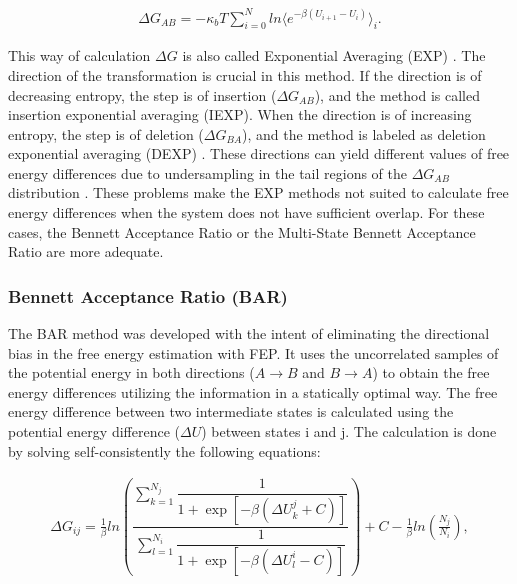 \documentclass[
	12pt,				%
	openany,			%
	oneside,			%
	a4paper,			%
	english,			%
	brazil				%
	]{abntex2}
\begin{document}
\begin{equation}
\label{eq:fepint}
\begin{aligned}
\Delta G_{AB} = -\kappa_{b}T  \sum_{i=0}^{N}
ln \langle {e^{-\beta (U_{i+1}-U_{i})}} \rangle_{i} .
\end{aligned}
\end{equation}

This way of calculation $\Delta G$ is also called Exponential Averaging (EXP) \cite{zwanzig1955,bareva}. The direction of the transformation is crucial in this method. If the direction is of decreasing entropy, the step is of insertion ($\Delta G_{AB}$), and the method is called insertion exponential averaging (IEXP). When the direction is of increasing entropy, the step is of deletion ($\Delta G_{BA}$), and the method is labeled as deletion exponential averaging (DEXP) \cite{bareva}. These directions can yield different values of free energy differences due to undersampling in the tail regions of the $\Delta G_{AB}$ distribution \cite{klimovich,pohorille2010}. These problems make the EXP methods not suited to calculate free energy differences when the system does not have sufficient overlap. For these cases, the Bennett Acceptance Ratio or the Multi-State Bennett Acceptance Ratio are more adequate.   

\subsubsection{Bennett Acceptance Ratio (BAR)}

The BAR method \cite{bennet1976} was developed with the intent of eliminating the directional bias in the free energy estimation with FEP. It uses the uncorrelated samples of the potential energy in both directions ($A \rightarrow B$ and $B \rightarrow A$) to obtain the free energy differences utilizing the information in a statically optimal way. The free energy difference between two intermediate states is calculated using the potential energy difference ($\Delta U$) between states i and j. The calculation is done by solving self-consistently the following equations: 

\begin{equation}
\label{eq:bar1}
\begin{aligned}
\Delta G_{ij} = \frac{1}{\beta} ln \left( \dfrac{\sum_{k=1}^{N_{j}} \dfrac{1}{1+\exp[-\beta(\Delta U_{k}^{j}+C)]}}{\sum_{l=1}^{N_{i}} \dfrac{1}{1+\exp[-\beta(\Delta U_{l}^{i}-C)]}}\right) + C - \frac{1}{\beta}ln\left(\frac{N_{j}}{N_{i}}\right),
\end{aligned}
\end{equation}
\end{document}
